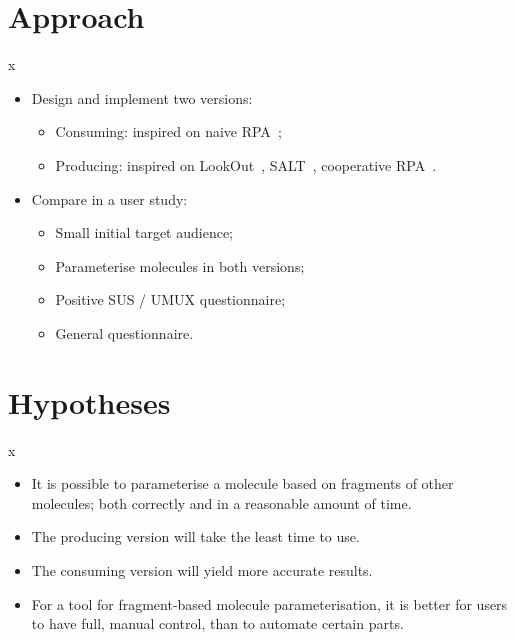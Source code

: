 \documentclass{beamer}
\newlength{\wideitemsep}
\let\olditem\item
\renewcommand{\item}[1][\wideitemsep]{\setlength{\itemsep}{#1}\olditem}
\def\sitem{\item[.2em]}
\begin{document}
\section{Approach}
\begin{frame}{x}{}
\begin{itemize}
\item<1-> Design and implement two versions:
      \begin{itemize}
      \sitem Consuming: inspired on naive RPA~\cite{payne2000varying};
      \sitem Producing: inspired on LookOut~\cite{horvitz1999principles}, SALT~\cite{marcus1987taking}, cooperative RPA~\cite{payne2000varying}.
      \end{itemize}
\item<2-> Compare in a user study:
      \begin{itemize}
      \sitem Small initial target audience;
      \sitem Parameterise molecules in both versions;
      \sitem Positive SUS / UMUX questionnaire;
      \sitem General questionnaire.
      \end{itemize}
\end{itemize}
\end{frame}



\section{Hypotheses}
\begin{frame}{x}{}
\begin{itemize}
\item<1-> It is possible to parameterise a molecule based on fragments of other molecules; both correctly and in a reasonable amount of time.
\item<2-> The producing version will take the least time to use.
\item<3-> The consuming version will yield more accurate results.
\item<4-> For a tool for fragment-based molecule parameterisation, it is better for users to have full, manual control, than to automate certain parts.
\end{itemize}
\end{frame}
\end{document}
